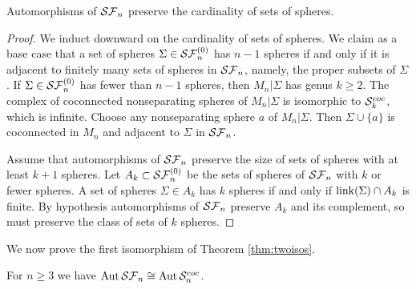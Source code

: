 \begin{lemma}
Automorphisms of ${ \mathcal {SF}_n }$ preserve the cardinality of sets of spheres.
\label{lemma:samenumspheres}
\end{lemma}

\begin{proof}
We induct downward on the cardinality of sets of spheres.
We claim as a base case that a set of spheres $\Sigma \in {\ensuremath{ \mathcal {SF}^{(0)}_n }}$ has $n-1$ spheres if and only if
it is adjacent to finitely many sets of spheres in ${ \mathcal {SF}_n }$, namely, the proper subsets of $\Sigma$.
If $\Sigma \in {\ensuremath{ \mathcal {SF}^{(0)}_n }}$ has fewer than $n-1$ spheres, then
$M_n|\Sigma$ has genus $k \geq 2$.
The complex of coconnected nonseparating spheres of $M_n|\Sigma$ is isomorphic to ${ \mathcal S^{{coc}}_{k} }$, which is infinite.
Choose any nonseparating sphere $a$ of $M_n|\Sigma$. Then $\Sigma \cup \{a\}$ is coconnected in $M_n$ and adjacent to $\Sigma$ in ${ \mathcal {SF}_n }$.

Assume that automorphisms of ${ \mathcal {SF}_n }$ preserve the size of sets of spheres with at least $k+1$ spheres.
Let $A_k \subset {\ensuremath{ \mathcal {SF}^{(0)}_n }}$ be the sets of spheres of ${ \mathcal {SF}_n }$ with $k$ or fewer spheres.
A set of spheres $\Sigma \in A_k$ has $k$ spheres if and only if $\operatorname{link}(\Sigma) \cap A_k$ is finite.
By hypothesis automorphisms of ${ \mathcal {SF}_n }$ preserve $A_k$ and its complement, so must preserve the class of sets of $k$ spheres.
\end{proof}

We now prove the first isomorphism of Theorem \ref{thm:twoisos}.\\

\begin{lemma}
For $n\geq 3$ we have $\operatorname{Aut} { \mathcal {SF}_n } \cong \operatorname{Aut}{{ \mathcal S^{{coc}}_{n} }}$.
\end{lemma}

